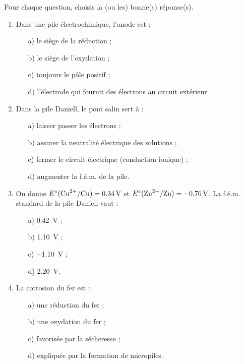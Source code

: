 \documentclass[11pt]{article}
\begin{document}
\begin{exercice}
Pour chaque question, choisis la (ou les) bonne(s) réponse(s).
\begin{enumerate}
\item Dans une pile électrochimique, l'anode est :
\begin{enumerate}
\item[a)] le siège de la réduction ;
\item[b)] le siège de l'oxydation ;
\item[c)] toujours le pôle positif ;
\item[d)] l'électrode qui fournit des électrons au circuit extérieur.
\end{enumerate}
\item Dans la pile Daniell, le pont salin sert à :
\begin{enumerate}
\item[a)] laisser passer les électrons ;
\item[b)] assurer la neutralité électrique des solutions ;
\item[c)] fermer le circuit électrique (conduction ionique) ;
\item[d)] augmenter la f.é.m. de la pile.
\end{enumerate}
\item On donne $E^\circ(\ce{Cu^2+}/\ce{Cu}) = \SI{+0,34}{V}$ et $E^\circ(\ce{Zn^2+}/\ce{Zn}) = \SI{-0,76}{V}$. La f.é.m. standard de la pile Daniell vaut :
\begin{enumerate}
\item[a)] \SI{0,42}{V} ; \item[b)] \SI{1,10}{V} ; \item[c)] \SI{-1,10}{V} ; \item[d)] \SI{2,20}{V}.
\end{enumerate}
\item La corrosion du fer est :
\begin{enumerate}
\item[a)] une réduction du fer ;
\item[b)] une oxydation du fer ;
\item[c)] favorisée par la sécheresse ;
\item[d)] expliquée par la formation de micropiles.
\end{enumerate}
\end{enumerate}
\end{exercice}
\end{document}
